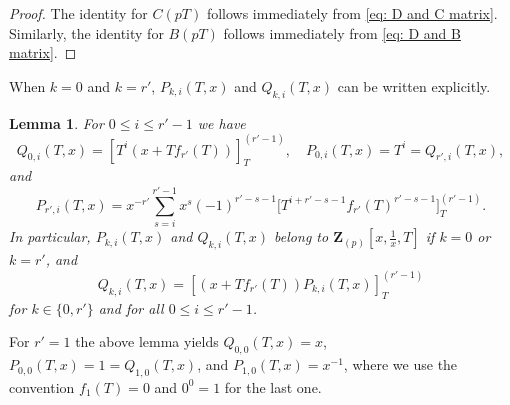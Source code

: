 \documentclass[11pt]{amsart}
\theoremstyle{definition}
\numberwithin{equation}{subsection}
\theoremstyle{plain}
\theoremstyle{plain}
\theoremstyle{plain}
\theoremstyle{plain}
\theoremstyle{plain}
\theoremstyle{plain}
\theoremstyle{plain}
\theoremstyle{plain}
\theoremstyle{plain}
\newtheorem{lemm}[equation]{Lemma}
\theoremstyle{plain}
\theoremstyle{plain}
\theoremstyle{plain}
\theoremstyle{definition}
\theoremstyle{definition}
\theoremstyle{definition}
\theoremstyle{remark}
\renewcommand{\(}{\textup{(}}
\renewcommand{\)}{\textup{)}}
\newcommand{\Z}{\mathbf{Z}}
\begin{document}
\begin{proof}
The identity for $C(pT)$ follows immediately from \eqref{eq: D and C matrix}. Similarly, the identity for $B(pT)$ follows immediately from \eqref{eq: D and B matrix}.
\end{proof}


When $k=0$ and $k=r'$, $P_{k,i}(T,x)$ and $Q_{k,i}(T,x)$ can be written explicitly.
\begin{lemm}\label{lemma: k=0,k=r}
For $0\leq i\leq r'-1$ we have
\begin{equation*}
   Q_{0,i}(T,x)=[T^i(x+Tf_{r'}(T))]_{T}^{(r'-1)},\quad  P_{0,i}(T,x)=T^i=Q_{r',i}(T,x),
\end{equation*}
and
\begin{equation*}
    P_{r',i}(T,x) =  x^{-r'}\sum_{s=i}^{r'-1}x^s (-1)^{r'-s-1}\Big[T^{i+r'-s-1}f_{r'}(T)^{r'-s-1}\Big]_{T}^{(r'-1)}.
\end{equation*}
In particular, $P_{k,i}(T,x)$ and $Q_{k,i}(T,x)$ belong to $\Z_{(p)}[x,\frac{1}{x},T]$ if $k=0$ or $k=r'$, and
$$Q_{k,i}(T,x)=[(x+Tf_{r'}(T))P_{k,i}(T,x)]_{T}^{(r'-1)}$$ for $k\in\{0,r'\}$ and for all $0\leq i\leq r'-1$.
\end{lemm}


For $r'=1$ the above lemma yields $Q_{0,0}(T,x)=x$, $P_{0,0}(T,x)=1=Q_{1,0}(T,x)$, and $P_{1,0}(T,x)=x^{-1}$, where we use the convention $f_1(T)=0$ and $0^0=1$ for the last one.
\end{document}
